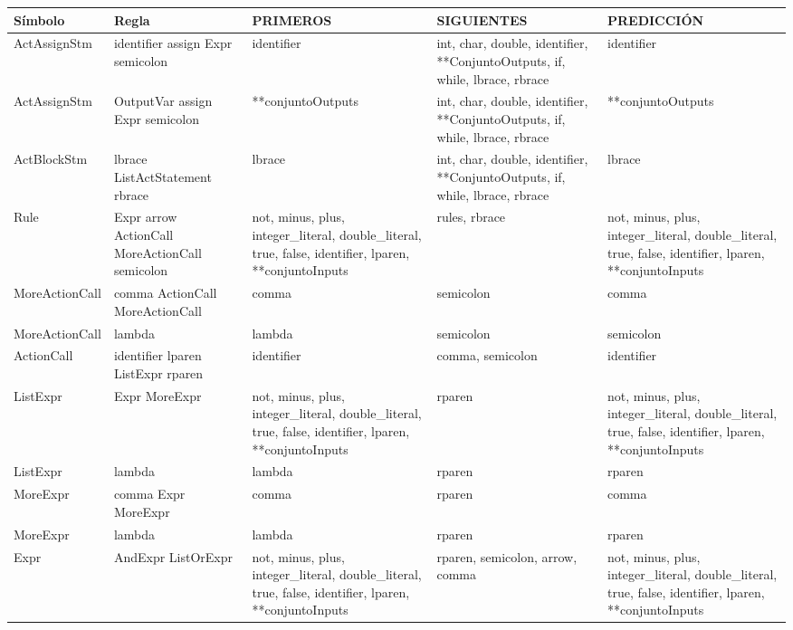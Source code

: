 \begin{tabularx}{\textwidth}{BBBBB}
          \toprule
          Símbolo & Regla & PRIMEROS & SIGUIENTES & PREDICCIÓN \\ \hline
          \midrule
      
               ActAssignStm & identifier assign Expr semicolon & identifier & int, char, double, identifier, **ConjuntoOutputs, if, while, lbrace, rbrace & identifier \\ \hline
               ActAssignStm & OutputVar assign Expr semicolon & **conjuntoOutputs & int, char, double, identifier, **ConjuntoOutputs, if, while, lbrace, rbrace & **conjuntoOutputs \\ \hline
                     
               ActBlockStm & lbrace ListActStatement rbrace & lbrace & int, char, double, identifier, **ConjuntoOutputs, if, while, lbrace, rbrace & lbrace \\ \hline
                     
               Rule  & Expr arrow ActionCall MoreActionCall semicolon & not, minus, plus, integer\_literal, double\_literal, true, false, identifier, lparen, **conjuntoInputs & rules, rbrace & not, minus, plus, integer\_literal, double\_literal, true, false, identifier, lparen, **conjuntoInputs \\ \hline
               MoreActionCall & comma ActionCall MoreActionCall & comma & semicolon & comma \\ \hline
               MoreActionCall & lambda & lambda & semicolon & semicolon \\ \hline
                     
               ActionCall & identifier lparen ListExpr rparen & identifier & comma, semicolon & identifier \\ \hline
               ListExpr & Expr MoreExpr & not, minus, plus, integer\_literal, double\_literal, true, false, identifier, lparen, **conjuntoInputs & rparen & not, minus, plus, integer\_literal, double\_literal, true, false, identifier, lparen, **conjuntoInputs \\ \hline
               ListExpr & lambda & lambda & rparen & rparen \\ \hline
               MoreExpr & comma Expr MoreExpr & comma & rparen & comma \\ \hline
               MoreExpr & lambda & lambda & rparen & rparen \\ \hline
                     
               Expr  & AndExpr ListOrExpr & not, minus, plus, integer\_literal, double\_literal, true, false, identifier, lparen, **conjuntoInputs & rparen, semicolon, arrow, comma & not, minus, plus, integer\_literal, double\_literal, true, false, identifier, lparen, **conjuntoInputs \\ \hline


           \bottomrule
               \end{tabularx}%

